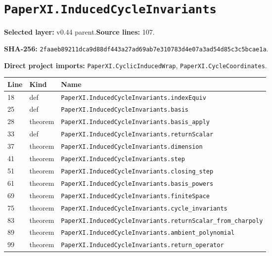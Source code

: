 \documentclass[10pt,oneside]{book}
\begin{document}
\section{\texorpdfstring{\nolinkurl{PaperXI.InducedCycleInvariants}}{PaperXI.InducedCycleInvariants}}\label{module:PaperXI.InducedCycleInvariants}

\textbf{Selected layer:} v0.44 parent.\quad\textbf{Source lines:} 107.\par\textbf{SHA-256:} {\scriptsize\nolinkurl{2faaeb89211dca9d88df443a27ad69ab7e310783d4e07a3ad54d85c3c5bcae1a}}.


\textbf{Direct project imports:} \nolinkurl{PaperXI.CyclicInducedWrap}, \nolinkurl{PaperXI.CycleCoordinates}.

\begin{longtable}{@{}p{}p{}p{}@{}}\toprule Line&Kind&Name\\\midrule\endhead

18&def&\nolinkurl{PaperXI.InducedCycleInvariants.indexEquiv}\\

25&def&\nolinkurl{PaperXI.InducedCycleInvariants.basis}\\

28&theorem&\nolinkurl{PaperXI.InducedCycleInvariants.basis_apply}\\

33&def&\nolinkurl{PaperXI.InducedCycleInvariants.returnScalar}\\

37&theorem&\nolinkurl{PaperXI.InducedCycleInvariants.dimension}\\

41&theorem&\nolinkurl{PaperXI.InducedCycleInvariants.step}\\

51&theorem&\nolinkurl{PaperXI.InducedCycleInvariants.closing_step}\\

61&theorem&\nolinkurl{PaperXI.InducedCycleInvariants.basis_powers}\\

69&theorem&\nolinkurl{PaperXI.InducedCycleInvariants.finiteSpace}\\

75&theorem&\nolinkurl{PaperXI.InducedCycleInvariants.cycle_invariants}\\

83&theorem&\nolinkurl{PaperXI.InducedCycleInvariants.returnScalar_from_charpoly}\\

89&theorem&\nolinkurl{PaperXI.InducedCycleInvariants.ambient_polynomial}\\

99&theorem&\nolinkurl{PaperXI.InducedCycleInvariants.return_operator}\\

\bottomrule\end{longtable}
\end{document}
